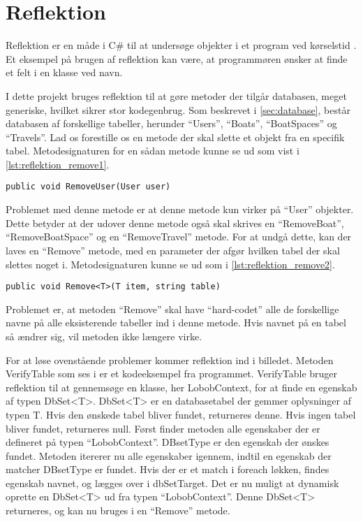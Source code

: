 \section{Reflektion}
\label{sec:reflektion}


Reflektion er en måde i C\# til at undersøge objekter i et program ved kørselstid \cite{michaelis2012essential}. Et eksempel på brugen af reflektion kan være, at programmøren ønsker at finde et felt i en klasse ved navn.

I dette projekt bruges reflektion til at gøre metoder der tilgår databasen, meget generiske, hvilket sikrer stor kodegenbrug. Som beskrevet i \cref{sec:database}, består databasen af forskellige tabeller, herunder \enquote{Users}, \enquote{Boats}, \enquote{BoatSpaces} og \enquote{Travels}. Lad os forestille os en metode der skal slette et objekt fra en specifik tabel. Metodesignaturen for en sådan metode kunne se ud som vist i \cref{lst:reflektion_remove1}.


\begin{lstlisting}[label=lst:reflektion_remove1]
public void RemoveUser(User user)
\end{lstlisting}

Problemet med denne metode er at denne metode kun virker på \enquote{User} objekter. Dette betyder at der udover denne metode også skal skrives en \enquote{RemoveBoat}, \enquote{RemoveBoatSpace} og en \enquote{RemoveTravel} metode. For at undgå dette, kan der laves en \enquote{Remove} metode, med en parameter der afgør hvilken tabel der skal slettes noget i. Metodesignaturen kunne se ud som i \cref{lst:reflektion_remove2}.


\begin{lstlisting}[label=lst:reflektion_remove2]
public void Remove<T>(T item, string table)
\end{lstlisting}

Problemet er, at metoden \enquote{Remove} skal have \enquote{hard-codet} alle de forskellige navne på alle eksisterende tabeller ind i denne metode. Hvis navnet på en tabel så ændrer sig, vil metoden ikke længere virke.

For at løse ovenstående problemer kommer reflektion ind i billedet. Metoden VerifyTable som ses i  er et kodeeksempel fra programmet. VerifyTable bruger reflektion til at gennemsøge en klasse, her LobobContext, for at finde en egenskab af typen DbSet<T>. DbSet<T> er en databasetabel der gemmer oplysninger af typen T. Hvis den ønskede tabel bliver fundet, returneres denne. Hvis ingen tabel bliver fundet, returneres null. Først finder metoden alle egenskaber der er defineret på typen \enquote{LobobContext}. DBsetType er den egenskab der ønskes fundet. Metoden itererer nu alle egenskaber igennem, indtil en egenskab der matcher DBsetType er fundet. Hvis der er et match i foreach løkken, findes egenskab navnet, og lægges over i dbSetTarget. Det er nu muligt at dynamisk oprette en DbSet<T> ud fra typen \enquote{LobobContext}. Denne DbSet<T> returneres, og kan nu bruges i en \enquote{Remove} metode.

